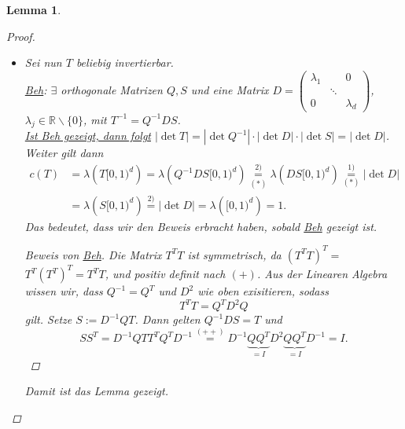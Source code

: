 \documentclass[a4paper]{report}
\newcommand{\R}{\mathbb{R}}
\theoremstyle{plain}
\newtheorem{lem}[thm]{Lemma}
\theoremstyle{definition}
\begin{document}
{{{{\begin{lem}
\begin{proof}
\begin{itemize}
            \item[3)]
                Sei nun $T$ beliebig invertierbar.\\
                \uline{Beh}: $\exists$ orthogonale Matrizen $Q,S$ und eine Matrix $D = \left(
                                                                                        \begin{smallmatrix}
                                                                                        \lambda_1 &        &  0       \\
                                                                                                & \ddots &          \\
                                                                                        0         &        & \lambda_d
                                                                                        \end{smallmatrix}
                                                                                       \right)$, $\lambda_j \in \R\backslash \{0\}$, mit $T^{-1} = Q^{-1}DS$.\\
                \uline{Ist Beh gezeigt, dann folgt} $|\det T| = |\det Q^{-1}| \cdot |\det D| \cdot |\det S| = |\det D|$. Weiter gilt dann
                \[
                    \begin{split}
                        c(T) &= \lambda\left(T[0,1)^d\right) = \lambda\left(Q^{-1}DS[0,1)^d\right) \underset{(*)}{\overset{2)}{=}} \lambda\left(DS[0,1)^d\right) \overset{1)}{\underset{(*)}{=}} |\det D|\\
                        &=\lambda\left(S[0,1)^d\right) \overset{2)}{=} |\det D| = \lambda\left([0,1)^d\right) = 1.
                    \end{split}
                \]
                Das bedeutet, dass wir den Beweis erbracht haben, sobald \uline{Beh} gezeigt ist.
                \begin{proof}[Beweis von \uline{Beh}]
                    Die Matrix $T^TT$ ist symmetrisch, da $\left(T^TT \right)^T =$\\$T^T \left(T^T\right)^T = T^TT$, und positiv definit nach $(+)$. Aus der Linearen Algebra wissen wir, dass $Q^{-1} = Q^T$ und $D^2$ wie oben exisitieren, sodass
                    \[
                        \tag{$++$}
                        T^TT=Q^TD^2Q
                    \]
                    gilt. Setze $S:=D^{-1}QT$. Dann gelten $Q^{-1}DS = T$ und
                    \[
                        SS^T = D^{-1}QTT^TQ^TD^{-1} \overset{(++)}{=} D^{-1}\underbrace{QQ^T}_{=I}D^2 \underbrace{QQ^T}_{=I} D^{-1} = I.
                    \]
                \end{proof}
                Damit ist das Lemma gezeigt.
        \end{itemize}
    \end{proof}
\end{lem}

}}}}
\end{document}
